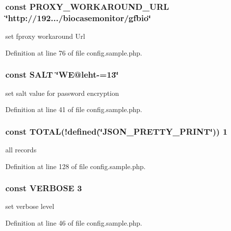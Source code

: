\subsubsection[{\texorpdfstring{P\+R\+O\+X\+Y\+\_\+\+W\+O\+R\+K\+A\+R\+O\+U\+N\+D\+\_\+\+U\+RL}{PROXY_WORKAROUND_URL}}]{\setlength{\rightskip}{0pt plus 5cm}const P\+R\+O\+X\+Y\+\_\+\+W\+O\+R\+K\+A\+R\+O\+U\+N\+D\+\_\+\+U\+RL \char`\"{}http\+://192.../biocasemonitor/gfbio\char`\"{}}\hypertarget{namespace_bms_a796fca3489760c39de0d4efdd11c67de}{}\label{namespace_bms_a796fca3489760c39de0d4efdd11c67de}
set fproxy workaround Url 

Definition at line 76 of file config.\+sample.\+php.

\subsubsection[{\texorpdfstring{S\+A\+LT}{SALT}}]{\setlength{\rightskip}{0pt plus 5cm}const S\+A\+LT \char`\"{}WE@leht-\/=13\char`\"{}}\hypertarget{namespace_bms_a6d448b74f10f8080293b329a47a046b4}{}\label{namespace_bms_a6d448b74f10f8080293b329a47a046b4}
set salt value for password encryption 

Definition at line 41 of file config.\+sample.\+php.

\subsubsection[{\texorpdfstring{T\+O\+T\+AL}{TOTAL}}]{\setlength{\rightskip}{0pt plus 5cm}const T\+O\+T\+AL(!defined(\char`\"{}J\+S\+O\+N\+\_\+\+P\+R\+E\+T\+T\+Y\+\_\+\+P\+R\+I\+NT\char`\"{})) 1}\hypertarget{namespace_bms_ad080a43f212802d39f67f19feeb26dfe}{}\label{namespace_bms_ad080a43f212802d39f67f19feeb26dfe}
all records 

Definition at line 128 of file config.\+sample.\+php.

\subsubsection[{\texorpdfstring{V\+E\+R\+B\+O\+SE}{VERBOSE}}]{\setlength{\rightskip}{0pt plus 5cm}const V\+E\+R\+B\+O\+SE 3}\hypertarget{namespace_bms_af070310b6692d4e96af677af14648411}{}\label{namespace_bms_af070310b6692d4e96af677af14648411}
set verbose level 

Definition at line 46 of file config.\+sample.\+php.

